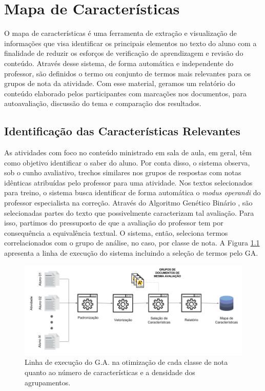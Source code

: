 
\chapter{Mapa de Características}\label{cap4}
O mapa de características é uma ferramenta de extração e visualização de informações que visa identificar os principais elementos no texto do aluno com a finalidade de reduzir os esforços de verificação de aprendizagem e revisão do conteúdo. Através desse sistema, de forma automática e independente do professor, são definidos o termo ou conjunto de termos mais relevantes para os grupos de nota da atividade. Com esse material, geramos um relatório do conteúdo elaborado pelos participantes com marcações nos documentos, para autoavaliação, discussão do tema e comparação dos resultados.

\section{Identificação das Características Relevantes}
As atividades com foco no conteúdo ministrado em sala de aula, em geral, têm como objetivo identificar o saber do aluno. Por conta disso, o sistema observa, sob o cunho avaliativo, trechos similares nos grupos de respostas com notas idênticas atribuídas pelo professor para uma atividade. Nos textos selecionados para treino, o sistema busca identificar de forma automática o \textit{modus operandi} do professor especialista na correção.  Através do Algoritmo Genético Binário \cite{haupt2004}, são selecionadas partes do texto que possivelmente caracterizam tal avaliação. Para isso, partimos do pressuposto de que a avaliação do professor tem por consequência a equivalência textual. O sistema, então, seleciona termos correlacionados com o grupo de análise, no caso, por classe de nota. A Figura \ref{mapa-alg-genetico} apresenta a linha de execução do sistema incluindo a seleção de termos pelo GA.

\begin{figure}[th]
\centering
\includegraphics[width=.9\textwidth]{./img/mapa-alg-genetico.png}
\caption{Linha de execução do G.A. na otimização de cada classe de nota quanto ao número de características e a densidade dos agrupamentos.}
\label{mapa-alg-genetico}
\end{figure}

